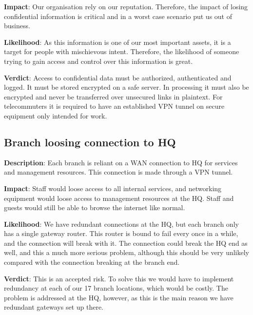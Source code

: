 \textbf{Impact}: Our organisation rely on our reputation. Therefore, the impact of losing confidential information is critical and in a worst case scenario put us out of business.

\textbf{Likelihood}: As this information is one of our most important assets, it is a target for people with mischievous intent. Therefore, the likelihood of someone trying to gain access and control over this information is great.

\textbf{Verdict}: Access to confidential data must be authorized, authenticated and logged. It must be stored encrypted on a safe server. In processing it must also be encrypted and never be transferred over unsecured links in plaintext. For telecommuters it is required to have an established VPN tunnel on secure equipment only intended for work.

%

\subsection{Branch loosing connection to HQ}

\textbf{Description}: Each branch is reliant on a WAN connection to HQ for services and management resources. This connection is made through a VPN tunnel.

\textbf{Impact}: Staff would loose access to all internal services, and networking equipment would loose access to management resources at the HQ. Staff and guests would still be able to browse the internet like normal.

\textbf{Likelihood}: We have redundant connections at the HQ, but each branch only has a single gateway router. This router is bound to fail every once in a while, and the connection will break with it. The connection could break the HQ end as well, and this a much more serious problem, although this should be very unlikely compared with the connection breaking at the branch end.

\textbf{Verdict}: This is an accepted risk. To solve this we would have to implement redundancy at each of our 17 branch locations, which would be costly. The problem is addressed at the HQ, however, as this is the main reason we have redundant gateways set up there.


